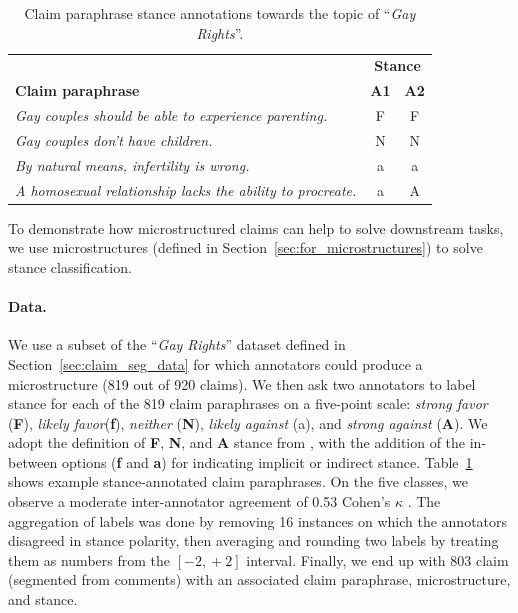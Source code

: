 \begin{table}[t]
\begin{center}
{%
\begin{tabular}{p{}c c}
\toprule
& \multicolumn{2}{c}{\textbf{Stance}}\\
\cmidrule(lr){2-3}
\textbf{\textbf{Claim paraphrase}} & \textbf{A1} & \textbf{A2} \\
\midrule
\emph{Gay couples should be able to experience parenting.} & F & F \\
\midrule
\emph{Gay couples don't have children.} & N & N \\
\midrule
\emph{By natural means, infertility is wrong.} & a & a \\
\midrule
\emph{A homosexual relationship lacks the ability to procreate.} & a & A  \\
\bottomrule
\end{tabular}}
\caption{Claim paraphrase 
	stance annotations towards the topic of ``\emph{Gay Rights}''.}
\label{tab:microstructure_stance}
\end{center}
\end{table}

To demonstrate how microstructured claims can help to solve downstream tasks,
we use microstructures (defined in Section~\ref{sec:for_microstructures})
to solve stance classification. 

\paragraph{Data.} We use a subset  of the ``\emph{Gay Rights}'' dataset defined in
Section~\ref{sec:claim_seg_data} for which annotators could produce 
a microstructure (819 out of 920 claims). We then ask two annotators to label
stance for each of the 819 claim paraphrases on a five-point scale:
\emph{strong favor} (\textbf{F}), \emph{likely favor}(\textbf{f}), \emph{neither} (\textbf{N}),
\emph{likely against} (a), and \emph{strong against} (\textbf{A}). 
We adopt the definition of \textbf{F}, \textbf{N}, and \textbf{A} stance from 
\citep{mohammad2016semeval}, with the addition of the in-between options
(\textbf{f} and \textbf{a}) for indicating implicit or indirect stance. 
Table~\ref{tab:microstructure_stance} shows example stance-annotated  
claim paraphrases. On the five classes, we observe a moderate inter-annotator
agreement of 0.53 Cohen's $\kappa$ \citep{cohen1960coefficient}.
The aggregation of labels was done by removing 16 instances on which the
annotators disagreed in stance polarity, then averaging and rounding two labels
by treating them as numbers from the $[-2, \mathop{+}2]$ interval.
Finally, we end up with 803 claim (segmented from comments) with an 
associated claim paraphrase, microstructure, and stance. 

